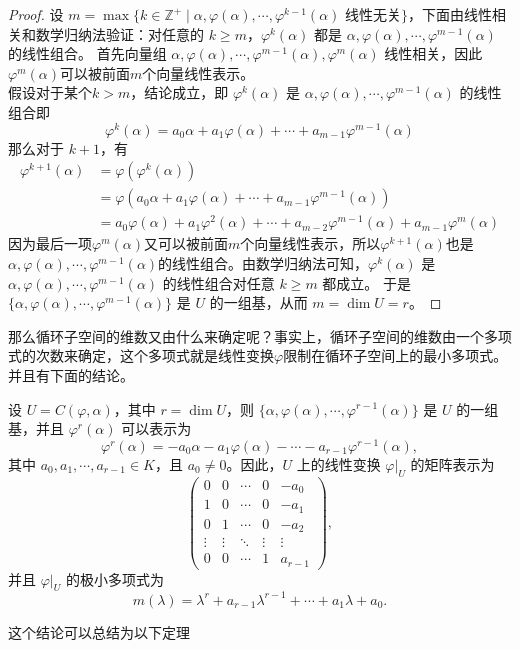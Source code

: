 \documentclass[lang=cn,12pt]{elegantbook}
\begin{document}
\begin{proof}
    设 \( m = \max\{k \in \mathbb{Z}^+ \mid \alpha, \varphi(\alpha), \cdots, \varphi^{k-1}(\alpha) \text{ 线性无关}\} \)，下面由线性相关和数学归纳法验证：对任意的 \( k \geq m \)，\( \varphi^k(\alpha) \) 都是 \( \alpha, \varphi(\alpha), \cdots, \varphi^{m-1}(\alpha) \) 的线性组合。
    首先向量组 \( \alpha, \varphi(\alpha), \cdots, \varphi^{m-1}(\alpha), \varphi^m(\alpha) \) 线性相关，因此$\varphi^m(\alpha)$可以被前面$m$个向量线性表示。 \\
假设对于某个$k > m$，结论成立，即 \(\varphi^k(\alpha)\) 是 \( \alpha, \varphi(\alpha), \cdots, \varphi^{m-1}(\alpha) \) 的线性组合即
\[
\varphi^k(\alpha) = a_0 \alpha + a_1 \varphi(\alpha) + \cdots + a_{m-1} \varphi^{m-1}(\alpha)
\]
那么对于 \( k+1 \)，有
\[
\begin{aligned}
\varphi^{k+1}(\alpha) &= \varphi(\varphi^k(\alpha)) \\
&= \varphi(a_0 \alpha + a_1 \varphi(\alpha) + \cdots + a_{m-1} \varphi^{m-1}(\alpha)) \\
&= a_0 \varphi(\alpha) + a_1 \varphi^2(\alpha) + \cdots + a_{m-2} \varphi^{m-1}(\alpha) + a_{m-1} \varphi^m(\alpha) 
\end{aligned}
\]
因为最后一项$\varphi^m(\alpha)$又可以被前面$m$个向量线性表示，所以\(\varphi^{k+1}(\alpha)\)也是\( \alpha, \varphi(\alpha), \cdots, \varphi^{m-1}(\alpha) \)的线性组合。由数学归纳法可知，\( \varphi^k(\alpha) \) 是 \( \alpha, \varphi(\alpha), \cdots, \varphi^{m-1}(\alpha) \) 的线性组合对任意 \( k \geq m \) 都成立。
    于是 \( \{ \alpha, \varphi(\alpha), \cdots, \varphi^{m-1}(\alpha)\} \) 是 \( U \) 的一组基，从而 \( m = \dim U = r \)。
\end{proof}

那么循环子空间的维数又由什么来确定呢？事实上，循环子空间的维数由一个多项式的次数来确定，这个多项式就是线性变换$\varphi$限制在循环子空间上的最小多项式。并且有下面的结论。

\begin{theorem}
    设 \( U = C(\varphi, \alpha) \)，其中 \( r = \dim U \)，则 \( \{\alpha, \varphi(\alpha), \cdots, \varphi^{r-1}(\alpha)\} \) 是 \( U \) 的一组基，并且 \( \varphi^r(\alpha) \) 可以表示为
\[
\varphi^r(\alpha) = -a_0 \alpha  -a_1 \varphi(\alpha) - \cdots - a_{r-1} \varphi^{r-1}(\alpha),
\]
其中 \( a_0, a_1, \cdots, a_{r-1} \in K \)，且 \( a_0 \neq 0 \)。因此，\( U \) 上的线性变换 \( \varphi|_U \) 的矩阵表示为
\[
\begin{pmatrix}
0 & 0 & \cdots & 0 & -a_0 \\
1 & 0 & \cdots & 0 & -a_1 \\
0 & 1 & \cdots & 0 & -a_2 \\
\vdots & \vdots & \ddots & \vdots & \vdots \\
0 & 0 & \cdots & 1 & a_{r-1}
\end{pmatrix},
\]
并且 \( \varphi|_U \) 的极小多项式为
\[
m(\lambda) = \lambda^r + a_{r-1} \lambda^{r-1} + \cdots + a_1 \lambda + a_0.
\]
\end{theorem}
这个结论可以总结为以下定理
\end{document}
